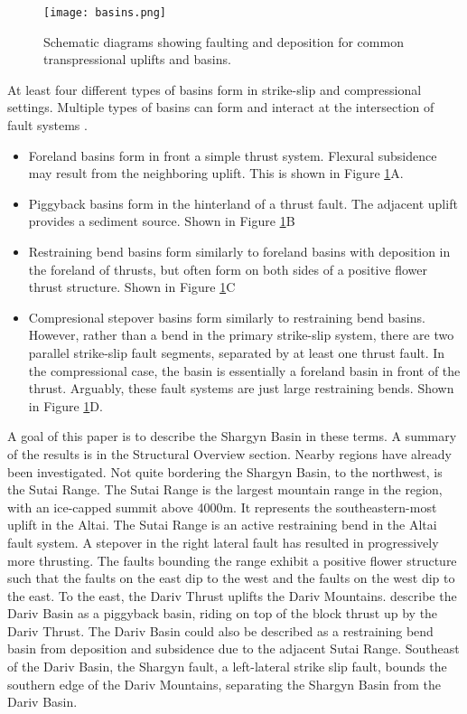 \documentclass[10pt,a4paper]{article}
\begin{document}
	
\begin{figure}[h!]
  \centering
  \texttt{[image: basins.png]}
  \caption{Schematic diagrams showing faulting and deposition for common transpressional uplifts and basins.}
  \label{basintypes}
\end{figure}

At least four different types of basins form in strike-slip and compressional settings. Multiple types of basins can form and interact at the intersection of fault systems \citep{Busby1995}.
\begin{itemize}
	\item Foreland basins form in front a simple thrust system. Flexural subsidence may result from the neighboring uplift. This is shown in Figure \ref{basintypes}A. 
	\item Piggyback basins form in the hinterland of a thrust fault. The adjacent uplift provides a sediment source. Shown in Figure \ref{basintypes}B
	\item Restraining bend basins form similarly to foreland basins with deposition in the foreland of thrusts, but often form on both sides of a positive flower thrust structure. Shown in Figure \ref{basintypes}C
	\item Compresional stepover basins form similarly to restraining bend basins. However, rather than a bend in the primary strike-slip system, there are two parallel strike-slip fault segments, separated by at least one thrust fault. In the compressional case, the basin is essentially a foreland basin in front of the thrust. Arguably, these fault systems are just large restraining bends. Shown in Figure \ref{basintypes}D.
\end{itemize}

	A goal of this paper is to describe the Shargyn Basin in these terms. A summary of the results is in the Structural Overview section. Nearby regions have already been investigated. Not quite bordering the Shargyn Basin, to the northwest, is the Sutai Range. The Sutai Range is the largest mountain range in the region, with an ice-capped summit above 4000m. It represents the southeastern-most uplift in the Altai. The Sutai Range is an active restraining bend in the Altai fault system\citep{Cunningham2003}\citep{Howard2006}. A stepover in the right lateral fault has resulted in progressively more thrusting. The faults bounding the range exhibit a positive flower structure such that the faults on the east dip to the west and the faults on the west dip to the east\citep{Cunningham2003}. To the east, the Dariv Thrust uplifts the Dariv Mountains. \citet{Howard2006} describe the Dariv Basin as a piggyback basin, riding on top of the block thrust up by the Dariv Thrust. The Dariv Basin could also be described as a restraining bend basin from deposition and subsidence due to the adjacent Sutai Range. Southeast of the Dariv Basin, the Shargyn fault, a left-lateral strike slip fault, bounds the southern edge of the Dariv Mountains, separating the Shargyn Basin from the Dariv Basin.
\end{document}
